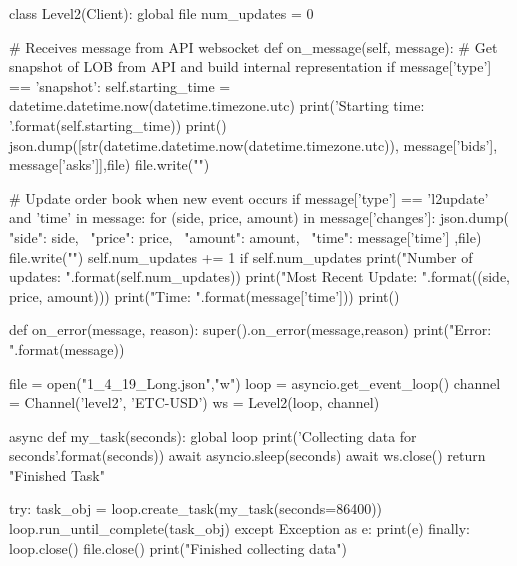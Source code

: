 class Level2(Client):
    global file
    num_updates = 0
      
    # Receives message from API websocket
    def on_message(self, message):
        # Get snapshot of LOB from API and build internal representation
        if message['type'] == 'snapshot':
            self.starting_time = datetime.datetime.now(datetime.timezone.utc)
            print('Starting time: {}'.format(self.starting_time))
            print()
            json.dump([str(datetime.datetime.now(datetime.timezone.utc)), message['bids'], message['asks']],file)
            file.write("\n")

            
        # Update order book when new event occurs
        if message['type'] == 'l2update' and 'time' in message:
            for (side, price, amount) in message['changes']:
                json.dump({
                    "side": side, \
                    "price": price, \
                    "amount": amount, \
                    "time": message['time']      
                },file)
                file.write("\n")
                self.num_updates += 1
                if self.num_updates %
                    print("Number of updates: {}".format(self.num_updates))
                    print("Most Recent Update: {}".format((side, price, amount)))
                    print("Time: {}".format(message['time']))
                    print()
                    
    def on_error(message, reason):
        super().on_error(message,reason)
        print("Error: {}".format(message))
            

file = open("1_4_19_Long.json","w")
loop = asyncio.get_event_loop()
channel = Channel('level2', 'ETC-USD')
ws = Level2(loop, channel)

async def my_task(seconds):
    global loop
    print('Collecting data for {} seconds'.format(seconds))
    await asyncio.sleep(seconds)
    await ws.close()
    return "Finished Task"

try:
    task_obj = loop.create_task(my_task(seconds=86400))
    loop.run_until_complete(task_obj)
except Exception as e:
    print(e)
finally:
    loop.close()
    file.close()
    print("Finished collecting data")